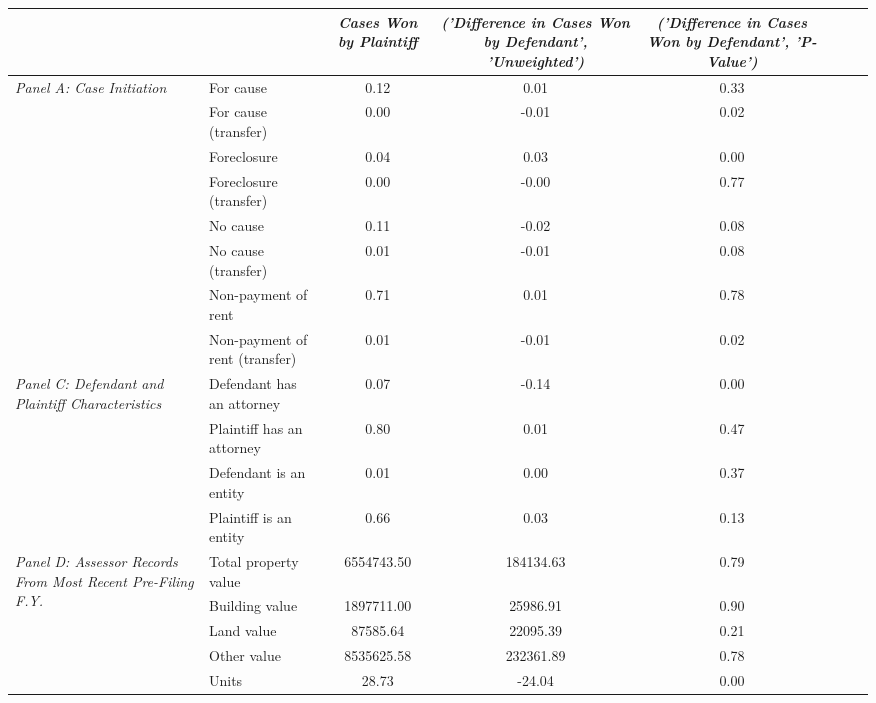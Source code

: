 \begin{tabular}{llcccccc}
\toprule
 &  & \textit{Cases Won by Plaintiff} & \textit{('Difference in Cases Won by Defendant', 'Unweighted')} & \textit{('Difference in Cases Won by Defendant', 'P-Value')} \\
\midrule
\multirow[c]{8}{4cm}{\textit{Panel A: Case Initiation}} & For cause & 0.12 & 0.01 & 0.33 \\
 & For cause (transfer) & 0.00 & -0.01 & 0.02 \\
 & Foreclosure & 0.04 & 0.03 & 0.00 \\
 & Foreclosure (transfer) & 0.00 & -0.00 & 0.77 \\
 & No cause & 0.11 & -0.02 & 0.08 \\
 & No cause (transfer) & 0.01 & -0.01 & 0.08 \\
 & Non-payment of rent & 0.71 & 0.01 & 0.78 \\
 & Non-payment of rent (transfer) & 0.01 & -0.01 & 0.02 \\
\cline{1-5}
\multirow[c]{4}{4cm}{\textit{Panel C: Defendant and Plaintiff Characteristics}} & Defendant has an attorney & 0.07 & -0.14 & 0.00 \\
 & Plaintiff has an attorney & 0.80 & 0.01 & 0.47 \\
 & Defendant is an entity & 0.01 & 0.00 & 0.37 \\
 & Plaintiff is an entity & 0.66 & 0.03 & 0.13 \\
\cline{1-5}
\multirow[c]{5}{4cm}{\textit{Panel D: Assessor Records From Most Recent Pre-Filing F.Y.}} & Total property value & 6554743.50 & 184134.63 & 0.79 \\
 & Building value & 1897711.00 & 25986.91 & 0.90 \\
 & Land value & 87585.64 & 22095.39 & 0.21 \\
 & Other value & 8535625.58 & 232361.89 & 0.78 \\
 & Units & 28.73 & -24.04 & 0.00 \\
\cline{1-5}
\bottomrule
\end{tabular}
